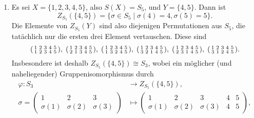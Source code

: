 \begin{bsp}
 \begin{enumerate}[leftmargin=*]
  \item
   Es sei $X = \{1,2,3,4,5\}$, also $S(X) = S_5$, und $Y = \{4,5\}$. Dann ist
   \[
    Z_{S_5}(\{4,5\}) = \{\sigma \in S_5 \mid \sigma(4) = 4, \sigma(5) = 5\}.
   \]
   Die Elemente von $Z_{S_5}(Y)$ sind also diejenigen Permutationen aus $S_5$, die tatächlich nur die ersten drei Element vertauschen. Diese sind 
   \[
    \begin{psmallmatrix}
     1 & 2 & 3 & 4 & 5 \\
     1 & 2 & 3 & 4 & 5
    \end{psmallmatrix},
    \;
    \begin{psmallmatrix}
     1 & 2 & 3 & 4 & 5 \\
     2 & 1 & 3 & 4 & 5
    \end{psmallmatrix},
    \;
    \begin{psmallmatrix}
     1 & 2 & 3 & 4 & 5 \\
     1 & 3 & 2 & 4 & 5
    \end{psmallmatrix},
    \;
    \begin{psmallmatrix}
     1 & 2 & 3 & 4 & 5 \\
     3 & 2 & 1 & 4 & 5
    \end{psmallmatrix},
    \;
    \begin{psmallmatrix}
     1 & 2 & 3 & 4 & 5 \\
     2 & 3 & 1 & 4 & 5
    \end{psmallmatrix},
    \;
    \begin{psmallmatrix}
     1 & 2 & 3 & 4 & 5 \\
     3 & 1 & 2 & 4 & 5
    \end{psmallmatrix}.
   \]
   Insbesondere ist deshalb $Z_{S_5}(\{4,5\}) \cong S_3$, wobei ein möglicher (und naheliegender) Gruppenisomorphismus durch
   \begin{align*}
    \varphi \colon S_3 &\longrightarrow Z_{S_5}(\{4,5\}), \\
    \sigma =
    \begin{pmatrix}
     1         & 2         & 3 \\
     \sigma(1) & \sigma(2) & \sigma(3)
    \end{pmatrix}
    &\longmapsto
    \begin{pmatrix}
     1         & 2         & 3         & 4 & 5 \\
     \sigma(1) & \sigma(2) & \sigma(3) & 4 & 5
    \end{pmatrix},

\end{align*}
\end{enumerate}
\end{bsp}
